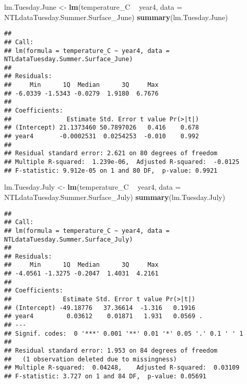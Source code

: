 \documentclass[]{article}
\newenvironment{Shaded}{\begin{snugshade}}{\end{snugshade}}
\newcommand{\DataTypeTok}[1]{\textcolor[rgb]{0.13,0.29,0.53}{#1}}
\newcommand{\KeywordTok}[1]{\textcolor[rgb]{0.13,0.29,0.53}{\textbf{#1}}}
\newcommand{\NormalTok}[1]{#1}
\newcommand{\OperatorTok}[1]{\textcolor[rgb]{0.81,0.36,0.00}{\textbf{#1}}}
\newcommand{\StringTok}[1]{\textcolor[rgb]{0.31,0.60,0.02}{#1}}
\begin{document}
\begin{Shaded}
\begin{Highlighting}[]
\NormalTok{lm.Tuesday.June <-}\StringTok{ }\KeywordTok{lm}\NormalTok{(temperature_C }\OperatorTok{~}\StringTok{ }\NormalTok{year4, }\DataTypeTok{data =}\NormalTok{ NTLdataTuesday.Summer.Surface_June)}
\KeywordTok{summary}\NormalTok{(lm.Tuesday.June)}
\end{Highlighting}
\end{Shaded}

\begin{verbatim}
## 
## Call:
## lm(formula = temperature_C ~ year4, data = NTLdataTuesday.Summer.Surface_June)
## 
## Residuals:
##     Min      1Q  Median      3Q     Max 
## -6.0339 -1.5343 -0.0279  1.9180  6.7676 
## 
## Coefficients:
##               Estimate Std. Error t value Pr(>|t|)
## (Intercept) 21.1373460 50.7897026   0.416    0.678
## year4       -0.0002531  0.0254253  -0.010    0.992
## 
## Residual standard error: 2.621 on 80 degrees of freedom
## Multiple R-squared:  1.239e-06,  Adjusted R-squared:  -0.0125 
## F-statistic: 9.912e-05 on 1 and 80 DF,  p-value: 0.9921
\end{verbatim}

\begin{Shaded}
\begin{Highlighting}[]
\NormalTok{lm.Tuesday.July <-}\StringTok{ }\KeywordTok{lm}\NormalTok{(temperature_C }\OperatorTok{~}\StringTok{ }\NormalTok{year4, }\DataTypeTok{data =}\NormalTok{ NTLdataTuesday.Summer.Surface_July)}
\KeywordTok{summary}\NormalTok{(lm.Tuesday.July)}
\end{Highlighting}
\end{Shaded}

\begin{verbatim}
## 
## Call:
## lm(formula = temperature_C ~ year4, data = NTLdataTuesday.Summer.Surface_July)
## 
## Residuals:
##     Min      1Q  Median      3Q     Max 
## -4.0561 -1.3275 -0.2047  1.4031  4.2161 
## 
## Coefficients:
##              Estimate Std. Error t value Pr(>|t|)  
## (Intercept) -49.18776   37.36614  -1.316   0.1916  
## year4         0.03612    0.01871   1.931   0.0569 .
## ---
## Signif. codes:  0 '***' 0.001 '**' 0.01 '*' 0.05 '.' 0.1 ' ' 1
## 
## Residual standard error: 1.953 on 84 degrees of freedom
##   (1 observation deleted due to missingness)
## Multiple R-squared:  0.04248,    Adjusted R-squared:  0.03109 
## F-statistic: 3.727 on 1 and 84 DF,  p-value: 0.05691
\end{verbatim}
\end{document}

